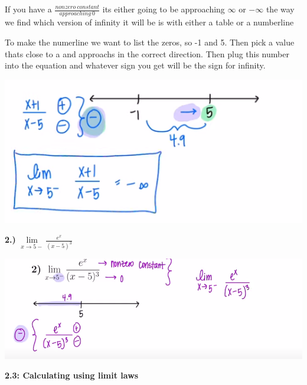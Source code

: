\documentclass{report}
\begin{document}
    \bigbreak 
    \begin{large}
        If you have a $ \frac{nonzero\ constant}{approaching\ 0} $ 
        its either going to be approaching $\infty$ or $-\infty$ the way we find which version of infinity
        it will be is with either a table or a numberline
    \end{large}
    
    \bigbreak 
    To make the numerline we want to list the zeros, so -1 and 5. Then pick a value thats close to a
    and approachs in the correct direction. Then plug this number into the equation and whatever sign you get
    will be the sign for infinity.
    \bigbreak \noindent 
    \begin{center}
        \includegraphics[scale=.5]{../images/line.png}
    \end{center}
    
    \bigbreak \noindent \bigbreak \noindent  
    \begin{large}
        \textbf{2.)} $\lim\limits_{x \to 5-}{ \frac{e^x}{ \left(x-5\right)^3}}$ 
    \end{large}

    \bigbreak \noindent 
    \begin{center}
       \includegraphics[scale=0.5]{ ../images/abc.png } 
    \end{center}
    
   \pagebreak
   \begin{Large}
      \noindent \textbf{2.3: Calculating using limit laws} 
    \end{Large}
  
\end{document}
